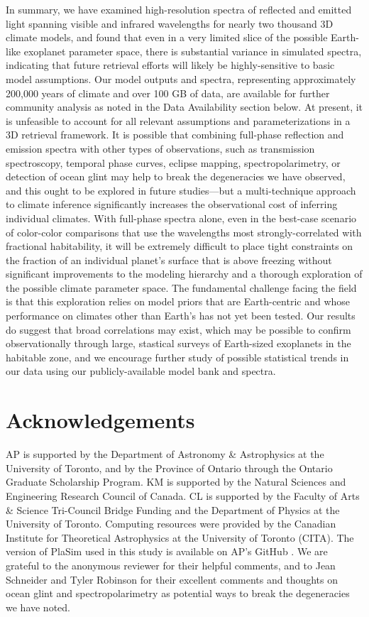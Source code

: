 \documentclass[fleqn,usenatbib]{mnras}
\begin{document}
In summary, we have examined high-resolution spectra of reflected and emitted light spanning visible and infrared wavelengths for nearly two thousand 3D climate models, and found that even in a very limited slice of the possible Earth-like exoplanet parameter space, there is substantial variance in simulated spectra, indicating that future retrieval efforts will likely be highly-sensitive to basic model assumptions. Our model outputs and spectra, representing approximately 200,000 years of climate and over 100 GB of data, are available for further community analysis as noted in the Data Availability section below. At present, it is unfeasible to account for all relevant assumptions and parameterizations in a 3D retrieval framework. It is possible that combining full-phase reflection and emission spectra with other types of observations, such as transmission spectroscopy, temporal phase curves, eclipse mapping, spectropolarimetry, or detection of ocean glint may help to break the degeneracies we have observed, and this ought to be explored in future studies---but a multi-technique approach to climate inference significantly increases the observational cost of inferring individual climates. With full-phase spectra alone, even in the best-case scenario of color-color comparisons that use the wavelengths most strongly-correlated with fractional habitability, it will be extremely difficult to place tight constraints on the fraction of an individual planet's surface that is above freezing without significant improvements to the modeling hierarchy and a thorough exploration of the possible climate parameter space. The fundamental challenge facing the field is that this exploration relies on model priors that are Earth-centric and whose performance on climates other than Earth's has not yet been tested. Our results do suggest that broad correlations may exist, which may be possible to confirm observationally through large, stastical surveys of Earth-sized exoplanets in the habitable zone, and we encourage further study of possible statistical trends in our data using our publicly-available model bank and spectra.

\section*{Acknowledgements}

AP is supported by the Department of Astronomy \& Astrophysics at the University of Toronto, and by the Province of Ontario through the Ontario Graduate Scholarship Program. KM is supported by the Natural Sciences and Engineering Research Council of Canada. CL is supported by the Faculty of Arts \& Science Tri-Council Bridge Funding and the Department of Physics at the University of Toronto. Computing resources were provided by the Canadian Institute for Theoretical Astrophysics at the University of Toronto (CITA). The version of PlaSim used in this study is available on AP's GitHub \citep[v1.1.0]{gplasim}. We are grateful to the anonymous reviewer for their helpful comments, and to Jean Schneider and Tyler Robinson for their excellent comments and thoughts on ocean glint and spectropolarimetry as potential ways to break the degeneracies we have noted.
\end{document}
